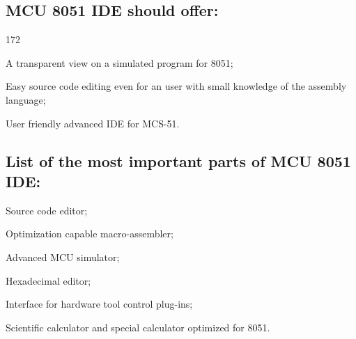 \documentclass[a4paper,twoside,12pt]{book}
\begin{document}
		\subsection*{MCU 8051 IDE should offer:}
			\begin{dingautolist}{172}
				\setlength{\itemsep}{-3pt}
				\item A transparent view on a simulated program for 8051;
				\item Easy source code editing even for an user with small knowledge of the assembly language;
				\item User friendly advanced IDE for MCS-51.
			\end{dingautolist}

		\subsection*{List of the most important parts of MCU 8051 IDE:}
			\begin{dinglist}{43}
				\setlength{\itemsep}{-3pt}
				\item Source code editor;
				\item Optimization capable macro-assembler;
				\item Advanced MCU simulator;
				\item Hexadecimal editor;
				\item Interface for hardware tool control plug-ins;
				\item Scientific calculator and special calculator optimized for 8051.
			\end{dinglist}
\end{document}
